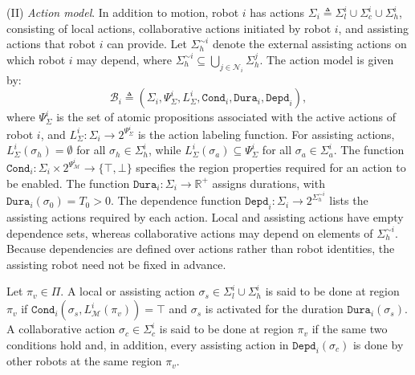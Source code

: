 (II) \emph{Action model}.
In addition to motion, robot $i$ has actions
$\Sigma_i \triangleq \Sigma_l^i \cup \Sigma_c^i \cup \Sigma_h^i$, consisting
of local actions, collaborative actions initiated by robot $i$, and assisting
actions that robot $i$ can provide.
Let $\Sigma_h^{\sim i}$ denote the
external assisting actions on which robot $i$ may depend, where
$\Sigma_h^{\sim i} \subseteq \bigcup_{j \in \mathcal{N}_i}\Sigma_h^j$. The
action model is given by:
\begin{equation}
\label{ch03:A}
\mathcal{B}_i \triangleq
(\Sigma_i, \Psi_{\Sigma}^i, L_{\Sigma}^i, \texttt{Cond}_i,
 \texttt{Dura}_i, \texttt{Depd}_i),
\end{equation}
where $\Psi_{\Sigma}^i$ is the set of atomic propositions associated with the
active actions of robot $i$, and
$L_{\Sigma}^i : \Sigma_i \rightarrow 2^{\Psi_{\Sigma}^i}$ is the action
labeling function. For assisting actions,
$L_{\Sigma}^i(\sigma_h)=\emptyset$ for all $\sigma_h \in \Sigma_h^i$, while
$L_{\Sigma}^i(\sigma_a)\subseteq \Psi_{\Sigma}^i$ for all
$\sigma_a \in \Sigma_a^i$.
The function
$\texttt{Cond}_i : \Sigma_i \times 2^{\Psi_{\mathcal{M}}^i}
\rightarrow \{\top,\bot\}$ specifies the region properties required for an
action to be enabled. The function
$\texttt{Dura}_i : \Sigma_i \rightarrow \mathbb{R}^+$ assigns durations, with
$\texttt{Dura}_i(\sigma_0)=T_0>0$. The dependence function
$\texttt{Depd}_i : \Sigma_i \rightarrow 2^{\Sigma_h^{\sim i}}$ lists the
assisting actions required by each action. Local and assisting actions have
empty dependence sets, whereas collaborative actions may depend on elements of
$\Sigma_h^{\sim i}$. Because dependencies are defined over actions rather than
robot identities, the assisting robot need not be fixed in advance.

\begin{definition}
\label{ch03:done}
Let $\pi_v \in \Pi$. A local or assisting action
$\sigma_s \in \Sigma_l^i \cup \Sigma_h^i$ is said to be done at region $\pi_v$
if
$\texttt{Cond}_i(\sigma_s,L_{\mathcal{M}}^i(\pi_v))=\top$ and $\sigma_s$ is
activated for the duration $\texttt{Dura}_i(\sigma_s)$. A collaborative action
$\sigma_c \in \Sigma_c^i$ is said to be done at region $\pi_v$ if the same two
conditions hold and, in addition, every assisting action in
$\texttt{Depd}_i(\sigma_c)$ is done by other robots at the same region $\pi_v$.
\end{definition}

